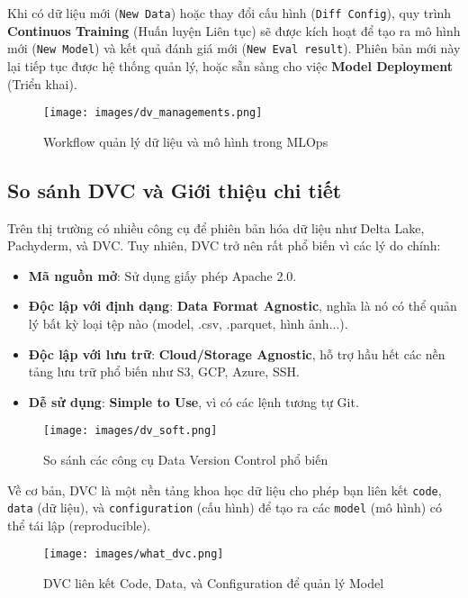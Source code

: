 \documentclass[11pt]{article}
\begin{document}
Khi có dữ liệu mới (\texttt{New Data}) hoặc thay đổi cấu hình (\texttt{Diff Config}), quy trình \textbf{Continuos Training} (Huấn luyện Liên tục) sẽ được kích hoạt để tạo ra mô hình mới (\texttt{New Model}) và kết quả đánh giá mới (\texttt{New Eval result}). Phiên bản mới này lại tiếp tục được hệ thống quản lý, hoặc sẵn sàng cho việc \textbf{Model Deployment} (Triển khai).

\begin{figure}[H]
    \centering
    \texttt{[image: images/dv\_managements.png]}
    \caption{Workflow quản lý dữ liệu và mô hình trong MLOps}
\end{figure}

\subsection{So sánh DVC và Giới thiệu chi tiết}
Trên thị trường có nhiều công cụ để phiên bản hóa dữ liệu như Delta Lake, Pachyderm, và DVC. Tuy nhiên, DVC trở nên rất phổ biến vì các lý do chính:
\begin{itemize}
    \item \textbf{Mã nguồn mở}: Sử dụng giấy phép Apache 2.0.
    \item \textbf{Độc lập với định dạng}: \textbf{Data Format Agnostic}, nghĩa là nó có thể quản lý bất kỳ loại tệp nào (model, .csv, .parquet, hình ảnh...).
    \item \textbf{Độc lập với lưu trữ}: \textbf{Cloud/Storage Agnostic}, hỗ trợ hầu hết các nền tảng lưu trữ phổ biến như S3, GCP, Azure, SSH.
    \item \textbf{Dễ sử dụng}: \textbf{Simple to Use}, vì có các lệnh tương tự Git.
\end{itemize}

\begin{figure}[H]
    \centering
    \texttt{[image: images/dv\_soft.png]}
    \caption{So sánh các công cụ Data Version Control phổ biến}
\end{figure}

Về cơ bản, DVC là một nền tảng khoa học dữ liệu cho phép bạn liên kết \texttt{code}, \texttt{data} (dữ liệu), và \texttt{configuration} (cấu hình) để tạo ra các \texttt{model} (mô hình) có thể tái lập (reproducible).

\begin{figure}[H]
    \centering
    \texttt{[image: images/what\_dvc.png]}
    \caption{DVC liên kết Code, Data, và Configuration để quản lý Model}
\end{figure}
\end{document}
